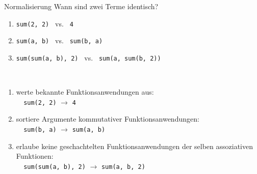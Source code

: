 \documentclass{beamer}
\begin{document}

\begin{frame}{Normalisierung}
	Wann sind zwei Terme identisch?
	\begin{enumerate}
		\item{\verb~sum(2, 2) ~ vs. \verb~ 4~}
		\item{\verb~sum(a, b) ~ vs. \verb~ sum(b, a)~}
		\item{\verb~sum(sum(a, b), 2) ~ vs. \verb~ sum(a, sum(b, 2))~}
	\end{enumerate}
	~\\
	\pause
	\begin{enumerate}
		\item{werte bekannte Funktionsanwendungen aus:\\
			\verb~  sum(2, 2)~ $\rightarrow$ \verb~4~}			
		\item{sortiere Argumente kommutativer Funktionsanwendungen:\\
			\verb~  sum(b, a)~ $\rightarrow$ \verb~sum(a, b)~}
		\item{erlaube keine geschachtelten Funktionsanwendungen der selben assoziativen Funktionen:\\
			\verb~  sum(sum(a, b), 2)~ $\rightarrow$ \verb~sum(a, b, 2)~}
	\end{enumerate}	
\end{frame}




\end{document}
